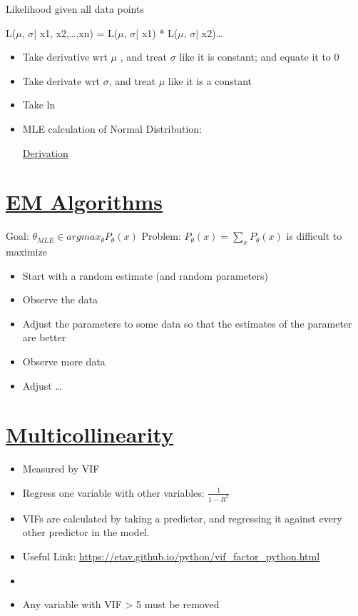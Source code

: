 \documentclass[11pt]{article}
\begin{document}
Likelihood given all data points

L(\(\mu\), \(\sigma\)| x1, x2,\ldots{},xn) =  L(\(\mu\), \(\sigma\)| x1) *  L(\(\mu\), \(\sigma\)| x2)\ldots{}

\begin{itemize}
\item Take derivative wrt \(\mu\) , and treat \(\sigma\) like it is constant; and equate it to 0
\item Take derivate wrt \(\sigma\), and treat \(\mu\) like it is a constant
\item Take ln
\item MLE calculation of Normal Distribution:

\href{./mle-normal-dist.pdf}{Derivation}
\end{itemize}

\section{\underline{EM Algorithms}}
\label{sec:org60e8452}

Goal: \(\theta_{MLE} \in argmax_{\theta}P_{\theta}(x)\)
Problem: \(P_{\theta}(x) = \sum_{x} P_{\theta}(x)\) is difficult to maximize

\begin{itemize}
\item Start with a random estimate (and random parameters)
\item Observe the data
\item Adjust the parameters to some data so that the estimates of the parameter are better
\item Observe more data
\item Adjust \ldots{}
\end{itemize}

\section{\underline{Multicollinearity}}
\label{sec:org898ce17}

\begin{itemize}
\item Measured by VIF
\item Regress one variable with other variables: \(\frac{1}{1-R^{2}}\)
\item VIFs are calculated by taking a predictor, and regressing it against every other predictor in the model.
\item Useful Link: \url{https://etav.github.io/python/vif\_factor\_python.html}
\item 

\item Any variable with VIF > 5 must be removed
\end{itemize}
\end{document}
